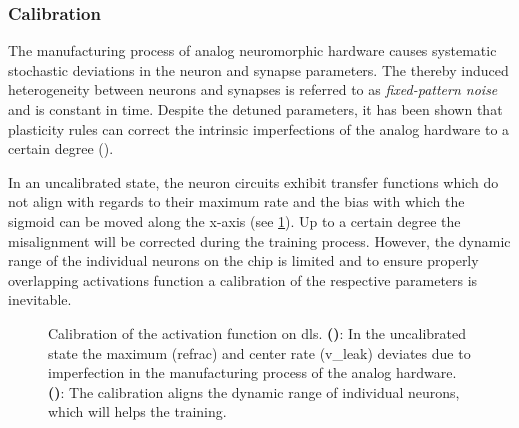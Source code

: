 \subsubsection*{Calibration}\label{calibration}
The manufacturing process of analog neuromorphic hardware causes systematic stochastic deviations in the neuron and synapse parameters. The thereby induced heterogeneity between neurons and synapses is referred to as \emph{fixed-pattern noise} and is constant in time. Despite the detuned parameters, it has been shown that plasticity rules can correct the intrinsic imperfections of the analog hardware to a certain degree (\citealp{wunderlich2019advantages}).

In an uncalibrated state, the neuron circuits exhibit transfer functions which do not align with regards to their maximum rate and the bias with which the sigmoid can be moved along the x-axis (see \cref{transferfunction_wout_calib}). Up to a certain degree the misalignment will be corrected during the training process. However, the dynamic range of the individual neurons on the chip is limited and to ensure properly overlapping activations function a calibration of the respective parameters is inevitable.
\begin{figure}
	\centering
	\begin{subfigure}[b]{0.49\textwidth}
		\caption{}
		
		\label{transferfunction_wout_calib}
	\end{subfigure}
	\begin{subfigure}[b]{0.49\textwidth}		
		\caption{}
		
		\label{transferfunction_w_calib}
	\end{subfigure}
	\caption[Calibration of the sigmoid activation function on \acrshort{dls}.]{Calibration of the activation function on \acrshort{dls}. \textbf{()}: In the uncalibrated state the maximum (\gls{refrac}) and center rate (\gls{v_leak}) deviates due to imperfection in the manufacturing process of the analog hardware.  \textbf{()}: The calibration aligns the dynamic range of individual neurons, which will helps the training.}
\end{figure}

